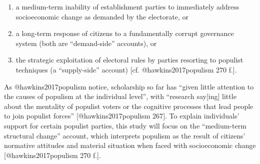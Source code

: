 \documentclass[]{article}
\begin{document}
\begin{enumerate}
\def\labelenumi{(\alph{enumi})}
\item
  a medium-term inability of establishment parties to immediately
  address socioeconomic change as demanded by the electorate, or
\item
  a long-term response of citizens to a fundamentally corrupt governance
  system (both are ``demand-side'' accounts), or
\item
  the strategic exploitation of electoral rules by parties resorting to
  populist techniques (a ``supply-side'' account) {[}cf.
  @hawkins2017populism 270 f.{]}.
\end{enumerate}

As @hawkins2017populism notice, scholarship so far has ``given little
attention to the causes of populism at the individual level'', with
``research say{[}ing{]} little about the mentality of populist voters or
the cognitive processes that lead people to join populist forces''
{[}@hawkins2017populism 267{]}. To explain individuals' support for
certain populist parties, this study will focus on the ``medium-term
structural change'' account, which interprets populism as the result of
citizens' normative attitudes and material situation when faced with
socioeconomic change {[}@hawkins2017populism 270 f.{]}.
\end{document}
